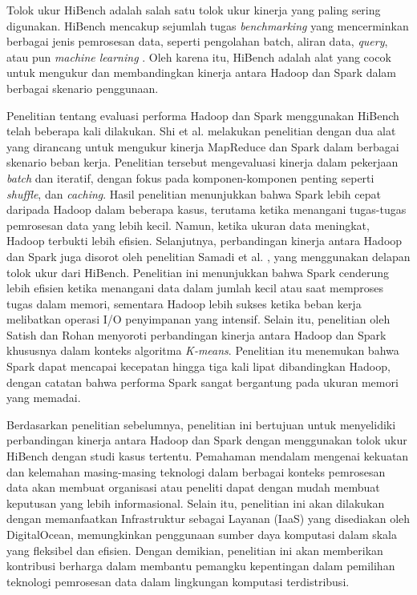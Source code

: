 Tolok ukur HiBench adalah salah satu tolok ukur kinerja yang paling sering digunakan. HiBench mencakup sejumlah tugas \textit{benchmarking} yang mencerminkan berbagai jenis pemrosesan data, seperti pengolahan batch, aliran data, \textit{query}, atau pun \textit{machine learning} \cite{huangHiBenchBenchmarkSuitea}. Oleh karena itu, HiBench adalah alat yang cocok untuk mengukur dan membandingkan kinerja antara Hadoop dan Spark dalam berbagai skenario penggunaan.

Penelitian tentang evaluasi performa Hadoop dan Spark menggunakan HiBench telah beberapa kali dilakukan. Shi et al. \cite{shiClashTitansMapReduce2015} melakukan penelitian dengan dua alat yang dirancang untuk mengukur kinerja MapReduce dan Spark dalam berbagai skenario beban kerja. Penelitian tersebut mengevaluasi kinerja dalam pekerjaan \textit{batch} dan iteratif, dengan fokus pada komponen-komponen penting seperti \textit{shuffle}, dan \textit{caching}. Hasil penelitian menunjukkan bahwa Spark lebih cepat daripada Hadoop dalam beberapa kasus, terutama ketika menangani tugas-tugas pemrosesan data yang lebih kecil. Namun, ketika ukuran data meningkat, Hadoop terbukti lebih efisien. Selanjutnya, perbandingan kinerja antara Hadoop dan Spark juga disorot oleh penelitian Samadi et al. \cite{samadiComparativeStudyHadoop2016}, yang menggunakan delapan tolok ukur dari HiBench. Penelitian ini menunjukkan bahwa Spark cenderung lebih efisien ketika menangani data dalam jumlah kecil atau saat memproses tugas dalam memori, sementara Hadoop lebih sukses ketika beban kerja melibatkan operasi I/O penyimpanan yang intensif. Selain itu, penelitian oleh Satish dan Rohan \cite{gopalaniComparingApacheSpark2015} menyoroti perbandingan kinerja antara Hadoop dan Spark khususnya dalam konteks algoritma \textit{K-means}. Penelitian itu menemukan bahwa Spark dapat mencapai kecepatan hingga tiga kali lipat dibandingkan Hadoop, dengan catatan bahwa performa Spark sangat bergantung pada ukuran memori yang memadai.

Berdasarkan penelitian sebelumnya, penelitian ini bertujuan untuk menyelidiki perbandingan kinerja antara Hadoop dan Spark dengan menggunakan tolok ukur HiBench dengan studi kasus tertentu. Pemahaman mendalam mengenai kekuatan dan kelemahan masing-masing teknologi dalam berbagai konteks pemrosesan data akan membuat organisasi atau peneliti dapat dengan mudah membuat keputusan yang lebih informasional. Selain itu, penelitian ini akan dilakukan dengan memanfaatkan Infrastruktur sebagai Layanan (IaaS) yang disediakan oleh DigitalOcean, memungkinkan penggunaan sumber daya komputasi dalam skala yang fleksibel dan efisien. Dengan demikian, penelitian ini akan memberikan kontribusi berharga dalam membantu pemangku kepentingan dalam pemilihan teknologi pemrosesan data dalam lingkungan komputasi terdistribusi.

